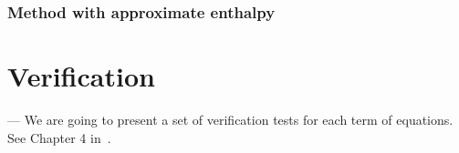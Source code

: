\documentclass{article}
\newcommand{\fusion}[1]{{#1}_\mathrm{fus}}
\begin{document}
\subsubsection{Method with approximate enthalpy}




\section{Verification}

--- We are going to present a set of verification tests for each term of equations. See Chapter 4 in~\cite{attar2011simulation}.
\end{document}
